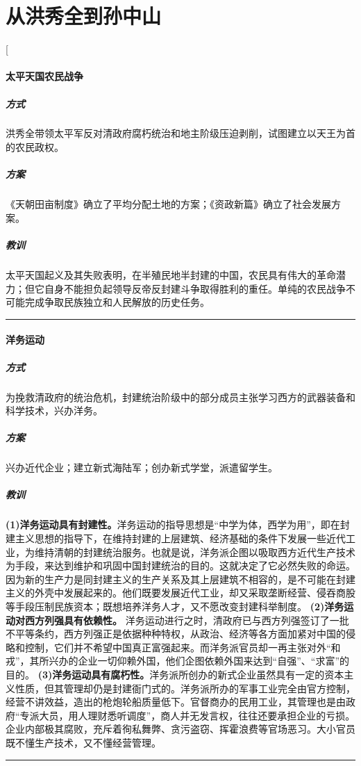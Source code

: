 
\section{从洪秀全到孙中山}
\begin{enumerate}
	\ans[
		\paragraph{太平天国农民战争}
		\subparagraph{方式} 洪秀全带领太平军反对清政府腐朽统治和地主阶级压迫剥削，试图建立以天王为首的农民政权。
		\subparagraph{方案} 《天朝田亩制度》确立了平均分配土地的方案；《资政新篇》确立了社会发展方案。
		\subparagraph{教训} 太平天国起义及其失败表明，在半殖民地半封建的中国，农民具有伟大的革命潜力；但它自身不能担负起领导反帝反封建斗争取得胜利的重任。单纯的农民战争不可能完成争取民族独立和人民解放的历史任务。
		\bigskip
		\hrule
		\bigskip
		\paragraph{洋务运动}
			\subparagraph{方式} 为挽救清政府的统治危机，封建统治阶级中的部分成员主张学习西方的武器装备和科学技术，兴办洋务。
			\subparagraph{方案}  兴办近代企业；建立新式海陆军；创办新式学堂，派遣留学生。
			\subparagraph{教训}{
				\textbf{(1)洋务运动具有封建性。}洋务运动的指导思想是“中学为体，西学为用”，即在封建主义思想的指导下，在维持封建的上层建筑、经济基础的条件下发展一些近代工业，为维持清朝的封建统治服务。也就是说，洋务派企图以吸取西方近代生产技术为手段，来达到维护和巩固中国封建统治的目的。这就决定了它必然失败的命运。因为新的生产力是同封建主义的生产关系及其上层建筑不相容的，是不可能在封建主义的外壳中发展起来的。他们既要发展近代工业，却又采取垄断经营、侵吞商股等手段压制民族资本；既想培养洋务人才，又不愿改变封建科举制度。
				\textbf{(2)洋务运动对西方列强具有依赖性。} 洋务运动进行之时，清政府已与西方列强签订了一批不平等条约，西方列强正是依据种种特权，从政治、经济等各方面加紧对中国的侵略和控制，它们并不希望中国真正富强起来。而洋务派官员却一再主张对外“和戎”，其所兴办的企业一切仰赖外国，他们企图依赖外国来达到“自强”、“求富”的目的。
				\textbf{(3)洋务运动具有腐朽性。}洋务派所创办的新式企业虽然具有一定的资本主义性质，但其管理却仍是封建衙门式的。洋务派所办的军事工业完全由官方控制，经营不讲效益，造出的枪炮轮船质量低下。官督商办的民用工业，其管理也是由政府“专派大员，用人理财悉听调度”，商人并无发言权，往往还要承担企业的亏损。企业内部极其腐败，充斥着徇私舞弊、贪污盗窃、挥霍浪费等官场恶习。大小官员既不懂生产技术，又不懂经营管理。
			}
		\bigskip
		\hrule
		\bigskip

\end{enumerate}
